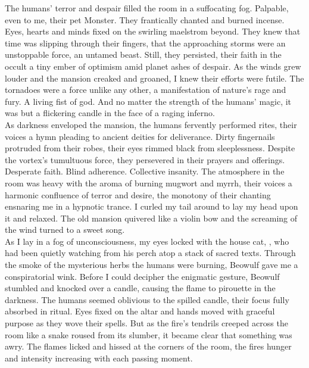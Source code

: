 
The humans' terror and despair filled the room in a suffocating fog. Palpable, even to me, their pet  Monster. They frantically chanted and burned incense. Eyes, hearts and minds fixed on the swirling maelstrom beyond. They knew that time was slipping through their fingers, that the approaching storms were an unstoppable force, an untamed beast. Still, they persisted, their faith in the occult a tiny ember of optimism amid planet  ashes of despair. As the winds grew louder and the mansion creaked and groaned, I knew their efforts were futile. The tornadoes were a force unlike any other, a manifestation of nature's rage and fury. A living fist of god. And no matter the strength of the humans' magic, it was but a flickering candle in the face of a raging inferno. \\

As darkness enveloped the mansion, the humans fervently performed rites, their voices a hymn pleading to ancient deities for deliverance. Dirty fingernails protruded from their robes, their eyes rimmed black from sleeplessness. Despite the vortex's tumultuous force, they persevered in their prayers and offerings. Desperate faith. Blind adherence. Collective insanity. The atmosphere in the room was heavy with the aroma of burning mugwort and myrrh, their voices a harmonic confluence of terror and desire, the monotony of their chanting ensnaring me in a hypnotic trance. I curled my tail around to lay my head upon it and relaxed. The old mansion quivered like a violin bow and the screaming of the wind turned to a sweet song. \\

As I lay in a fog of unconsciousness, my eyes locked with the house cat, , who had been quietly watching from his perch atop a stack of sacred texts. Through the smoke of the mysterious herbs the humans were burning, Beowulf gave me a conspiratorial wink. Before I could decipher the enigmatic gesture, Beowulf stumbled and knocked over a candle, causing the flame to pirouette in the darkness. The humans seemed oblivious to the spilled candle, their focus fully absorbed in ritual. Eyes fixed on the altar and hands moved with graceful purpose as they wove their spells. But as the fire's tendrils creeped across the room like a snake roused from its slumber, it became clear that something was awry. The flames licked and hissed at the corners of the room, the fires hunger and intensity increasing with each passing moment. \\

